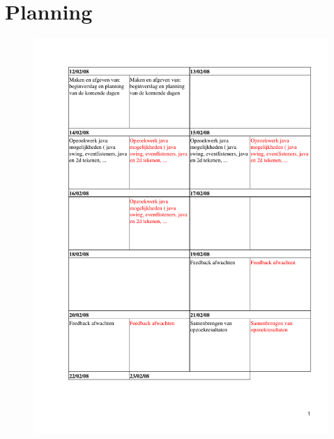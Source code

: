 \documentclass[a4paper,11pt,oneside, titlepage]{article}
\begin{document}
\section{Planning}
\begin{figure}[htbp]
\centering
\includegraphics[scale=0.55, page=1]{./planning.pdf}
\end{figure}
\end{document}
